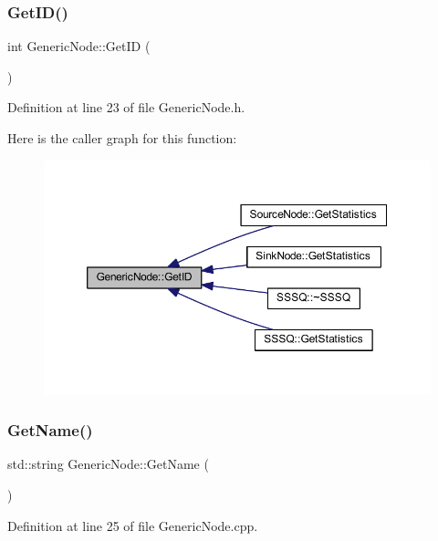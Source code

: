 \subsubsection{\texorpdfstring{Get\+I\+D()}{GetID()}}
{\footnotesize\ttfamily int Generic\+Node\+::\+Get\+ID (\begin{DoxyParamCaption}{ }\end{DoxyParamCaption})\hspace{0.3cm}{\ttfamily [inline]}}



Definition at line 23 of file Generic\+Node.\+h.

Here is the caller graph for this function\+:
\nopagebreak
\begin{figure}[H]
\begin{center}
\leavevmode
\includegraphics[width=350pt]{class_generic_node_aa73c27d677012efdcda65f7908c77758_icgraph}
\end{center}
\end{figure}
\mbox{\label{class_generic_node_aaf9d163658172370e01ef5da113b66e0}} 
\subsubsection{\texorpdfstring{Get\+Name()}{GetName()}}
{\footnotesize\ttfamily std\+::string Generic\+Node\+::\+Get\+Name (\begin{DoxyParamCaption}{ }\end{DoxyParamCaption})}



Definition at line 25 of file Generic\+Node.\+cpp.

